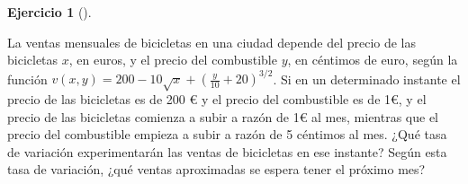 \documentclass[
  a4paper,
]{scrreport}
\theoremstyle{definition}
\newtheorem{exercise}{Ejercicio}[chapter]
\theoremstyle{remark}
\begin{document}
\leavevmode{}%
\begin{exercise}[]\label{exr-regla-cadena-5}

La ventas mensuales de bicicletas en una ciudad depende del precio de
las bicicletas \(x\), en euros, y el precio del combustible \(y\), en
céntimos de euro, según la función
\(v(x,y)=200-10\sqrt{x}+(\frac{y}{10}+20)^{3/2}\). Si en un determinado
instante el precio de las bicicletas es de 200 € y el precio del
combustible es de 1€, y el precio de las bicicletas comienza a subir a
razón de 1€ al mes, mientras que el precio del combustible empieza a
subir a razón de 5 céntimos al mes. ¿Qué tasa de variación
experimentarán las ventas de bicicletas en ese instante? Según esta tasa
de variación, ¿qué ventas aproximadas se espera tener el próximo mes?

\end{exercise}
\end{document}

